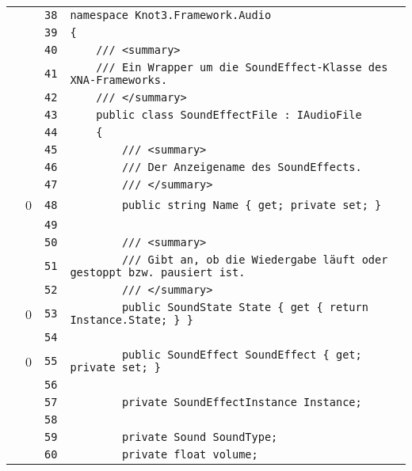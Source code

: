 \documentclass[a4paper,10pt]{article}
\begin{document}
\begin{longtable}[l]{lrrl}
\cellcolor{gray} &  & \verb~38~ & \verb~namespace Knot3.Framework.Audio~\\
\cellcolor{gray} &  & \verb~39~ & \verb~{~\\
\cellcolor{gray} &  & \verb~40~ & \verb~    /// <summary>~\\
\cellcolor{gray} &  & \verb~41~ & \verb~    /// Ein Wrapper um die SoundEffect-Klasse des XNA-Frameworks.~\\
\cellcolor{gray} &  & \verb~42~ & \verb~    /// </summary>~\\
\cellcolor{gray} &  & \verb~43~ & \verb~    public class SoundEffectFile : IAudioFile~\\
\cellcolor{gray} &  & \verb~44~ & \verb~    {~\\
\cellcolor{gray} &  & \verb~45~ & \verb~        /// <summary>~\\
\cellcolor{gray} &  & \verb~46~ & \verb~        /// Der Anzeigename des SoundEffects.~\\
\cellcolor{gray} &  & \verb~47~ & \verb~        /// </summary>~\\
\cellcolor{red} & 0 & \verb~48~ & \verb~        public string Name { get; private set; }~\\
\cellcolor{gray} &  & \verb~49~ & \verb~~\\
\cellcolor{gray} &  & \verb~50~ & \verb~        /// <summary>~\\
\cellcolor{gray} &  & \verb~51~ & \verb~        /// Gibt an, ob die Wiedergabe läuft oder gestoppt bzw. pausiert ist.~\\
\cellcolor{gray} &  & \verb~52~ & \verb~        /// </summary>~\\
\cellcolor{red} & 0 & \verb~53~ & \verb~        public SoundState State { get { return Instance.State; } }~\\
\cellcolor{gray} &  & \verb~54~ & \verb~~\\
\cellcolor{red} & 0 & \verb~55~ & \verb~        public SoundEffect SoundEffect { get; private set; }~\\
\cellcolor{gray} &  & \verb~56~ & \verb~~\\
\cellcolor{gray} &  & \verb~57~ & \verb~        private SoundEffectInstance Instance;~\\
\cellcolor{gray} &  & \verb~58~ & \verb~~\\
\cellcolor{gray} &  & \verb~59~ & \verb~        private Sound SoundType;~\\
\cellcolor{gray} &  & \verb~60~ & \verb~        private float volume;~\\

\end{longtable}
\end{document}
